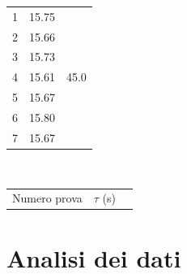 \documentclass{article}
\begin{document}
\begin{table}[h!]
\begin{minipage}{0.1\textwidth}
\begin{tabular}{ | r | c | c | }
    				\hline
    				1 & 15.75 & \multirow{7}{*}{45.0} \\ \cline{1-2}
    				2 & 15.66 & \\ \cline{1-2}
    				3 & 15.73 & \\ \cline{1-2}
    				4 & 15.61 & \\ \cline{1-2}
    				5 & 15.67 & \\ \cline{1-2}
    				6 & 15.80 & \\ \cline{1-2}
    				7 & 15.67 & \\ \cline{1-2}
    				\hline
			\end{tabular}
	\end{minipage} \\
	\begin{minipage}{0.1\textwidth}
		\begin{tabular}{ | r | c | c | }
			\hline
			\multirow{2}{5em}{Numero prova} & $\tau$ (s) 
		\end{tabular}
	\end{minipage}
\end{table}
\section{Analisi dei dati}
\end{document}
